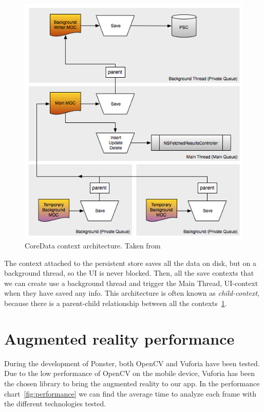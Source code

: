 \begin{figure}
\centering
\includegraphics[scale=0.75]{img/coredataarch.png}
\caption{\label{fig:coredataarch}CoreData context architecture. Taken
  from~\cite{coredataarch}} 
\end{figure} 

The context attached to the persistent store saves all the data on disk, but on a
background thread, so the UI is never blocked. Then, all the save contexts that we
can create use a background thread and trigger the Main Thread, UI-context when they
have saved any info. This architecture is often known as \emph{child-context},
because there is a parent-child relationship between all the
contexts~\ref{fig:coredataarch}. 

\section{Augmented reality performance}
\label{sec:arperf}
During the development of Ponster, both OpenCV and Vuforia have been tested. Due to
the low performance of OpenCV on the mobile device, Vuforia has been the chosen library
to bring the augmented reality to our app. In the performance
chart~\ref{fig:performance} we can find the average time to analyze each frame with
the different technologies tested. 

